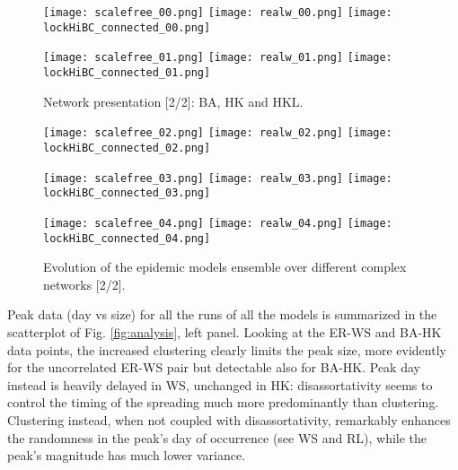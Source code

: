 \documentclass[DIV=12, BCOR=0pt]{scrartcl}  %
\begin{document}
  
  \clearpage
  
  \begin{figure}[h!]
  	\centering
  	\texttt{[image: scalefree\_00.png]}
  	\texttt{[image: realw\_00.png]}
  	\texttt{[image: lockHiBC\_connected\_00.png]}
  	
  	\texttt{[image: scalefree\_01.png]}
  	\texttt{[image: realw\_01.png]}
  	\texttt{[image: lockHiBC\_connected\_01.png]}
  	\caption{Network presentation [2/2]: BA, HK and HKL.}
  	\label{fig:networks1}
  \end{figure}  	
  
  \begin{figure}[h!]
  	\centering 
  	
  	\texttt{[image: scalefree\_02.png]}
  	\texttt{[image: realw\_02.png]}
  	\texttt{[image: lockHiBC\_connected\_02.png]}
  	
  	\texttt{[image: scalefree\_03.png]}
  	\texttt{[image: realw\_03.png]}
  	\texttt{[image: lockHiBC\_connected\_03.png]}
  	
  	\texttt{[image: scalefree\_04.png]}
  	\texttt{[image: realw\_04.png]}
  	\texttt{[image: lockHiBC\_connected\_04.png]}
  	
  	\caption{Evolution of the epidemic models ensemble over different complex networks [2/2].}
  	\label{fig:outcomes1}
  \end{figure}
  \clearpage
 
  
  Peak data (day vs size) for all the runs of all the models is summarized in the scatterplot of Fig. \ref{fig:analysis}, left panel. Looking at the ER-WS and BA-HK data points, the increased clustering clearly limits the peak size, more evidently for the uncorrelated ER-WS pair but detectable also for BA-HK. Peak day instead is heavily delayed in WS, unchanged in HK: disassortativity seems to control the timing of the spreading much more predominantly than clustering. Clustering instead, when not coupled with disassortativity, remarkably enhances the randomness in the peak's day of occurrence (see WS and RL), while the peak's magnitude has much lower variance.
  
\end{document}
